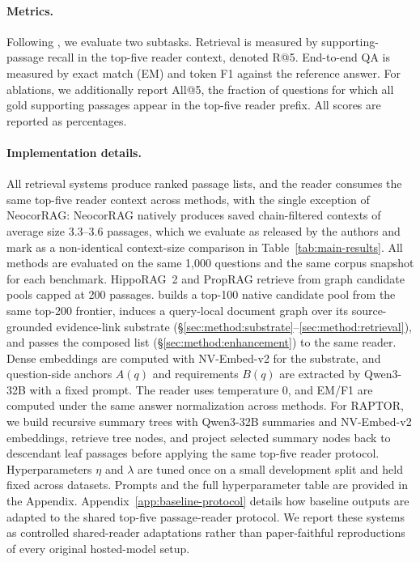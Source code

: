 \paragraph{Metrics.}
Following \citet{gutierrez2025hipporag}, we evaluate two subtasks.
Retrieval is measured by supporting-passage recall in the top-five
reader context, denoted R@5. End-to-end QA is measured by exact match
(EM) and token F1 against the reference answer. For ablations, we
additionally report All@5, the fraction of questions for which all
gold supporting passages appear in the top-five reader prefix. All
scores are reported as percentages.

\paragraph{Implementation details.}
All retrieval systems produce ranked passage lists, and the reader
consumes the same top-five reader context across methods, with the
single exception of NeocorRAG: NeocorRAG natively produces saved
chain-filtered contexts of average size $3.3$--$3.6$ passages,
which we evaluate as released by the authors and mark as a
non-identical context-size comparison in
Table~\ref{tab:main-results}. All methods
are evaluated on the same 1{,}000 questions and the same corpus
snapshot for each benchmark. HippoRAG~2 and PropRAG retrieve from graph
candidate pools capped at 200 passages.
\methodname{} builds a top-100 native candidate pool from the same
top-200 frontier, induces a query-local document graph over its
source-grounded evidence-link substrate
(\S\ref{sec:method:substrate}--\ref{sec:method:retrieval}), and passes
the composed list (\S\ref{sec:method:enhancement}) to the same reader.
Dense embeddings are computed with NV-Embed-v2 for the substrate, and
question-side anchors $A(q)$ and requirements $B(q)$ are extracted by
Qwen3-32B with a fixed prompt. The reader uses temperature 0, and
EM/F1 are computed under the same answer normalization across methods.
For RAPTOR, we build recursive summary trees with Qwen3-32B summaries
and NV-Embed-v2 embeddings, retrieve tree nodes, and project selected
summary nodes back to descendant leaf passages before applying the same
top-five reader protocol.
Hyperparameters $\eta$ and $\lambda$ are tuned once on a small
development split and held fixed across datasets. Prompts and the full
hyperparameter table are provided in the Appendix.
Appendix~\ref{app:baseline-protocol} details how baseline outputs are
adapted to the shared top-five passage-reader protocol.
We report these systems as controlled shared-reader adaptations rather
than paper-faithful reproductions of every original hosted-model setup.

